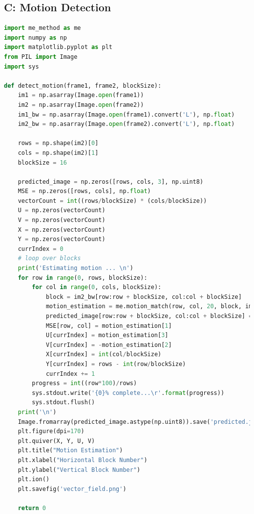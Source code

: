 \documentclass[11pt,a4paper]{article}
\begin{document}
\subsection{C: Motion Detection}
\begin{lstlisting}[language=Python]
import me_method as me
import numpy as np
import matplotlib.pyplot as plt
from PIL import Image
import sys

def detect_motion(frame1, frame2, blockSize):
    im1 = np.asarray(Image.open(frame1))
    im2 = np.asarray(Image.open(frame2))
    im1_bw = np.asarray(Image.open(frame1).convert('L'), np.float)
    im2_bw = np.asarray(Image.open(frame2).convert('L'), np.float)

    rows = np.shape(im2)[0]
    cols = np.shape(im2)[1]
    blockSize = 16

    predicted_image = np.zeros([rows, cols, 3], np.uint8)
    MSE = np.zeros([rows, cols], np.float)
    vectorCount = int((rows/blockSize) * (cols/blockSize))
    U = np.zeros(vectorCount)
    V = np.zeros(vectorCount)
    X = np.zeros(vectorCount)
    Y = np.zeros(vectorCount)
    currIndex = 0
    # loop over blocks
    print('Estimating motion ... \n')
    for row in range(0, rows, blockSize):
        for col in range(0, cols, blockSize):
            block = im2_bw[row:row + blockSize, col:col + blockSize]
            motion_estimation = me.motion_match(row, col, 20, block, im1_bw, im1)
            predicted_image[row:row + blockSize, col:col + blockSize] = motion_estimation[0]
            MSE[row, col] = motion_estimation[1]
            U[currIndex] = motion_estimation[3]
            V[currIndex] = -motion_estimation[2]
            X[currIndex] = int(col/blockSize)
            Y[currIndex] = rows - int(row/blockSize)
            currIndex += 1
        progress = int((row*100)/rows)
        sys.stdout.write('{0}% complete...\r'.format(progress))
        sys.stdout.flush()
    print('\n')
    Image.fromarray(predicted_image.astype(np.uint8)).save('predicted.jpg')
    plt.figure(dpi=170)
    plt.quiver(X, Y, U, V)
    plt.title("Motion Estimation")
    plt.xlabel("Horizontal Block Number")
    plt.ylabel("Vertical Block Number")
    plt.ion()
    plt.savefig('vector_field.png')

    return 0
\end{lstlisting}

\pagebreak
\end{document}
